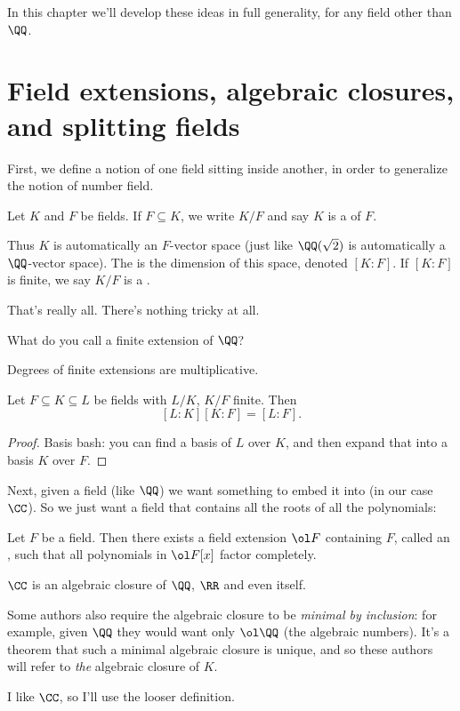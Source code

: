 In this chapter we'll develop these ideas in full generality, for any field other than $\QQ$.

\section{Field extensions, algebraic closures, and splitting fields}

First, we define a notion of one field sitting inside another,
in order to generalize the notion of number field.
\begin{definition}
	Let $K$ and $F$ be fields.
	If $F \subseteq K$, we write $K/F$ and say $K$ is a
	 of $F$.
	
	Thus $K$ is automatically an $F$-vector space
	(just like $\QQ(\sqrt 2)$ is automatically a $\QQ$-vector space).
	The  is the dimension of this space, denoted $[K:F]$.
	If $[K:F]$ is finite, we say $K/F$ is a .
\end{definition}
That's really all. There's nothing tricky at all.

\begin{ques}
	What do you call a finite extension of $\QQ$?
\end{ques}

Degrees of finite extensions are multiplicative.
\begin{theorem}
	Let $F \subseteq K \subseteq L$ be fields with $L/K$, $K/F$ finite. Then
	\[ [L:K][K:F] = [L:F]. \]
\end{theorem}
\begin{proof}
	Basis bash: you can find a basis of $L$ over $K$, and then expand that into a basis $K$ over $F$.
\end{proof}

Next, given a field (like $\QQ$) we want something to embed it into (in our case $\CC$).
So we just want a field that contains all the roots of all the polynomials:
\begin{theorem}
	Let $F$ be a field.
	Then there exists a field extension $\ol F$ containing $F$, called an ,
	such that all polynomials in $\ol F[x]$ factor completely.
\end{theorem}
\begin{example}
	[$\CC$]
	$\CC$ is an algebraic closure of $\QQ$, $\RR$ and even itself.
\end{example}
\begin{abuse}
	Some authors also require the algebraic closure to be \emph{minimal by inclusion}:
	for example, given $\QQ$ they would want only $\ol\QQ$ (the algebraic numbers).
	It's a theorem that such a minimal algebraic closure is unique,
	and so these authors will refer to \emph{the} algebraic closure of $K$.

	I like $\CC$, so I'll use the looser definition.
\end{abuse}


